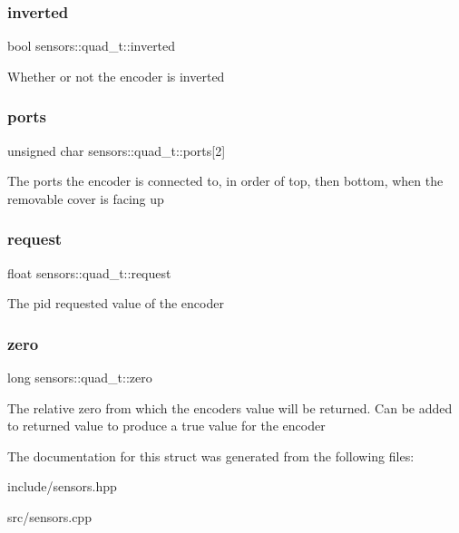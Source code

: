 \subsubsection{\texorpdfstring{inverted}{inverted}}
{\footnotesize\ttfamily bool sensors\+::quad\+\_\+t\+::inverted}

Whether or not the encoder is inverted \mbox{\label{structsensors_1_1quad__t_ab3ac2cbedde9a5d8cb680e8c4bcdec74}} 
\subsubsection{\texorpdfstring{ports}{ports}}
{\footnotesize\ttfamily unsigned char sensors\+::quad\+\_\+t\+::ports\mbox{[}2\mbox{]}}

The ports the encoder is connected to, in order of top, then bottom, when the removable cover is facing up \mbox{\label{structsensors_1_1quad__t_ab1cf656f73ea0165459e90c035c0b03c}} 
\subsubsection{\texorpdfstring{request}{request}}
{\footnotesize\ttfamily float sensors\+::quad\+\_\+t\+::request}

The pid requested value of the encoder \mbox{\label{structsensors_1_1quad__t_a06d5116929f4ed2878d452c02470c644}} 
\subsubsection{\texorpdfstring{zero}{zero}}
{\footnotesize\ttfamily long sensors\+::quad\+\_\+t\+::zero}

The relative zero from which the encoder\textquotesingle{}s value will be returned. Can be added to returned value to produce a true value for the encoder 

The documentation for this struct was generated from the following files\+:\begin{DoxyCompactItemize}
\item 
include/sensors.\+hpp\item 
src/sensors.\+cpp\end{DoxyCompactItemize}
